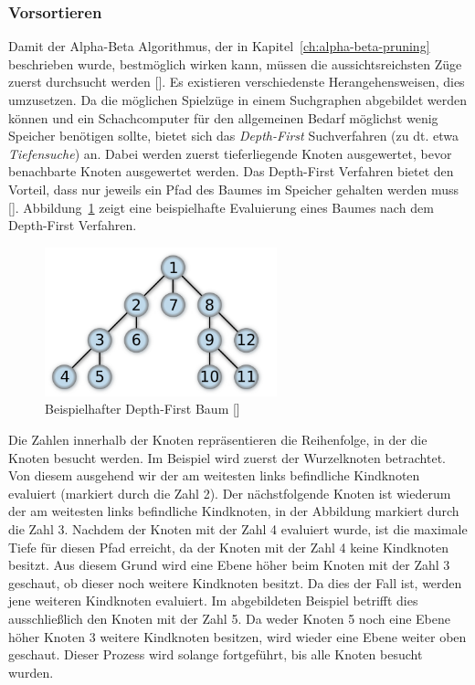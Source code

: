 \subsubsection{Vorsortieren}

Damit der Alpha-Beta Algorithmus, der in Kapitel~\ref{ch:alpha-beta-pruning} beschrieben wurde, bestmöglich wirken kann, müssen die aussichtsreichsten Züge zuerst durchsucht werden [\cite{Wiki2019}].
Es existieren verschiedenste Herangehensweisen, dies umzusetzen.
Da die möglichen Spielzüge in einem Suchgraphen abgebildet werden können und ein Schachcomputer für den allgemeinen Bedarf möglichst wenig Speicher benötigen sollte, bietet sich das \textit{Depth-First} Suchverfahren (zu dt. etwa \textit{Tiefensuche}) an.
Dabei werden zuerst tieferliegende Knoten ausgewertet, bevor benachbarte Knoten ausgewertet werden.
Das Depth-First Verfahren bietet den Vorteil, dass nur jeweils ein Pfad des Baumes im Speicher gehalten werden muss [\cite{Wiki2019b}].
Abbildung~\ref{fig:pre-sorting_depth-first-tree} zeigt eine beispielhafte Evaluierung eines Baumes nach dem Depth-First Verfahren.

\begin{figure}[H]
    \centering
    \includegraphics[width=0.6\textwidth]{images/theory/pre-sorting_depth-first-tree.png}
    \caption[Beispielhafter Depth-First Baum]{Beispielhafter Depth-First Baum [\cite{Wiki2019b}]}
    \label{fig:pre-sorting_depth-first-tree}
\end{figure}

\noindent Die Zahlen innerhalb der Knoten repräsentieren die Reihenfolge, in der die Knoten besucht werden.
Im Beispiel wird zuerst der Wurzelknoten betrachtet.
Von diesem ausgehend wir der am weitesten links befindliche Kindknoten evaluiert (markiert durch die Zahl 2).
Der nächstfolgende Knoten ist wiederum der am weitesten links befindliche Kindknoten, in der Abbildung markiert durch die Zahl 3.
Nachdem der Knoten mit der Zahl 4 evaluiert wurde, ist die maximale Tiefe für diesen Pfad erreicht, da der Knoten mit der Zahl 4 keine Kindknoten besitzt.
Aus diesem Grund wird eine Ebene höher beim Knoten mit der Zahl 3 geschaut, ob dieser noch weitere Kindknoten besitzt.
Da dies der Fall ist, werden jene weiteren Kindknoten evaluiert.
Im abgebildeten Beispiel betrifft dies ausschließlich den Knoten mit der Zahl 5.
Da weder Knoten 5 noch eine Ebene höher Knoten 3 weitere Kindknoten besitzen, wird wieder eine Ebene weiter oben geschaut.
Dieser Prozess wird solange fortgeführt, bis alle Knoten besucht wurden.

